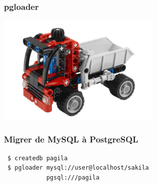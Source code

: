 \documentclass{beamer}
\begin{document}
\begin{frame}
  \frametitle{pgloader}

  
  \begin{center}
    \includegraphics[height=2.1in]{pgloader.jpg}
  \end{center}
\end{frame}

\begin{frame}[fragile]
  \frametitle{Migrer de MySQL à PostgreSQL}

  \vfill

\begin{verbatim}
 $ createdb pagila
 $ pgloader mysql://user@localhost/sakila
            pgsql:///pagila
\end{verbatim}
\end{frame}
\end{document}
